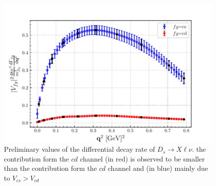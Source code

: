 


\begin{figure}
  \centering
  \includegraphics[scale=0.8]{plots/final_DgammaDq2.pdf}
  \caption{Preliminary values of the differential decay rate of
    $D_s\to X\ell\nu$.
    the contribution form the $cd$ channel (in red) is observed to be smaller than
    the contribution form the $cd$ channel and (in blue) mainly due to $V_{cs}>V_{cd}$ }
  \label{fig:dGammadq_Ds}
\end{figure}

